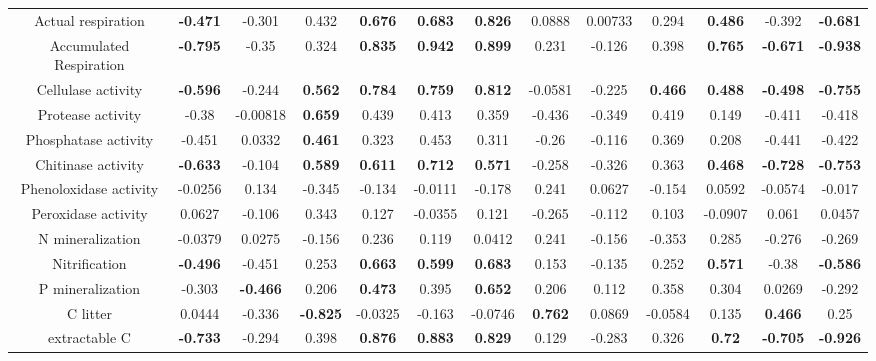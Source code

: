 \documentclass[authoryear,preprint,review,12pt]{elsarticle}
\begin{document}
\begin{landscape}
\begin{table}[h!]
\begin{center}
{\begin{tabular}{ccccccccccccc}
  Actual respiration & \textbf{ -0.471 } & -0.301 & 0.432 & \textbf{ 0.676 } & \textbf{ 0.683 } & \textbf{ 0.826 } & 0.0888 & 0.00733 & 0.294 & \textbf{ 0.486 } & -0.392 & \textbf{ -0.681 } \\ 
  Accumulated Respiration & \textbf{ -0.795 } & -0.35 & 0.324 & \textbf{ 0.835 } & \textbf{ 0.942 } & \textbf{ 0.899 } & 0.231 & -0.126 & 0.398 & \textbf{ 0.765 } & \textbf{ -0.671 } & \textbf{ -0.938 } \\ 
  Cellulase activity & \textbf{ -0.596 } & -0.244 & \textbf{ 0.562 } & \textbf{ 0.784 } & \textbf{ 0.759 } & \textbf{ 0.812 } & -0.0581 & -0.225 & \textbf{ 0.466 } & \textbf{ 0.488 } & \textbf{ -0.498 } & \textbf{ -0.755 } \\ 
  Protease activity & -0.38 & -0.00818 & \textbf{ 0.659 } & 0.439 & 0.413 & 0.359 & -0.436 & -0.349 & 0.419 & 0.149 & -0.411 & -0.418 \\ 
  Phosphatase activity & -0.451 & 0.0332 & \textbf{ 0.461 } & 0.323 & 0.453 & 0.311 & -0.26 & -0.116 & 0.369 & 0.208 & -0.441 & -0.422 \\ 
  Chitinase activity & \textbf{ -0.633 } & -0.104 & \textbf{ 0.589 } & \textbf{ 0.611 } & \textbf{ 0.712 } & \textbf{ 0.571 } & -0.258 & -0.326 & 0.363 & \textbf{ 0.468 } & \textbf{ -0.728 } & \textbf{ -0.753 } \\ 
  Phenoloxidase activity & -0.0256 & 0.134 & -0.345 & -0.134 & -0.0111 & -0.178 & 0.241 & 0.0627 & -0.154 & 0.0592 & -0.0574 & -0.017 \\ 
  Peroxidase activity & 0.0627 & -0.106 & 0.343 & 0.127 & -0.0355 & 0.121 & -0.265 & -0.112 & 0.103 & -0.0907 & 0.061 & 0.0457 \\ 
  N mineralization & -0.0379 & 0.0275 & -0.156 & 0.236 & 0.119 & 0.0412 & 0.241 & -0.156 & -0.353 & 0.285 & -0.276 & -0.269 \\ 
  Nitrification & \textbf{ -0.496 } & -0.451 & 0.253 & \textbf{ 0.663 } & \textbf{ 0.599 } & \textbf{ 0.683 } & 0.153 & -0.135 & 0.252 & \textbf{ 0.571 } & -0.38 & \textbf{ -0.586 } \\ 
  P mineralization & -0.303 & \textbf{ -0.466 } & 0.206 & \textbf{ 0.473 } & 0.395 & \textbf{ 0.652 } & 0.206 & 0.112 & 0.358 & 0.304 & 0.0269 & -0.292 \\ 
  C litter & 0.0444 & -0.336 & \textbf{ -0.825 } & -0.0325 & -0.163 & -0.0746 & \textbf{ 0.762 } & 0.0869 & -0.0584 & 0.135 & \textbf{ 0.466 } & 0.25 \\ 
  extractable C & \textbf{ -0.733 } & -0.294 & 0.398 & \textbf{ 0.876 } & \textbf{ 0.883 } & \textbf{ 0.829 } & 0.129 & -0.283 & 0.326 & \textbf{ 0.72 } & \textbf{ -0.705 } & \textbf{ -0.926 } \\ 

\end{tabular}}
\end{center}
\end{table}
\end{landscape}
\end{document}
